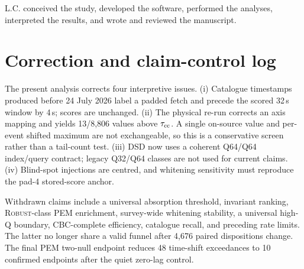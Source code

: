 \documentclass[aps,prd,twocolumn,superscriptaddress,nofootinbib,amsmath,amssymb,floatfix,10pt]{revtex4-2}
\newcommand{\robust}{\textsc{Robust}}
\begin{document}
L.C. conceived the study, developed the software, performed the analyses,
interpreted the results, and wrote and reviewed the manuscript.

\appendix

\section{Correction and claim-control log}

The present analysis corrects four interpretive issues.  (i) Catalogue timestamps
produced before 24 July 2026 label a padded fetch and precede the scored
32\,s window by 4\,s; scores are unchanged.  (ii) The physical re-run corrects
an axis mapping and yields 13/8,806 values above $\tau_{\rm cc}$.  A single
on-source value and per-event shifted maximum are not exchangeable, so this is
a conservative screen rather than a tail-count test.  (iii) DSD now uses a
coherent Q64/Q64 index/query contract; legacy Q32/Q64 classes are not used for
current claims.  (iv) Blind-spot injections are centred, and whitening sensitivity
must reproduce the pad-4 stored-score anchor.

Withdrawn claims include a universal absorption threshold, invariant ranking,
\robust-class PEM enrichment, survey-wide whitening stability, a universal
high-Q boundary, CBC-complete efficiency, catalogue recall, and preceding rate limits.
The latter no longer share a valid funnel after 4,676 paired dispositions
change.  The final PEM two-null endpoint reduces 48 time-shift exceedances to
10 confirmed endpoints after the quiet zero-lag control.

\clearpage


\end{document}
